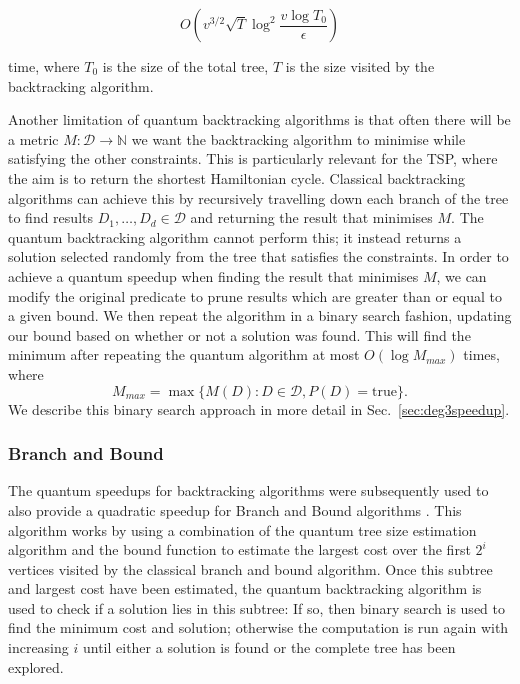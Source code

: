 $$O\left(v^{3/2}\sqrt{T}\log^2\frac{v\log T_0}{\epsilon}\right)$$

\noindent time, where $T_0$ is the size of the total tree, $T$ is the size visited by the backtracking algorithm.

Another limitation of quantum backtracking algorithms is that often there will be a metric $M \colon \mathcal{D} \rightarrow \mathbb{N}$ we want the backtracking algorithm to minimise while satisfying the other constraints. This is particularly relevant for the TSP, where the aim is to return the shortest Hamiltonian cycle. Classical backtracking algorithms can achieve this by recursively travelling down each branch of the tree to find results $D_1,\dots,D_d \in \mathcal{D}$ and returning the result that minimises $M$. The quantum backtracking algorithm cannot perform this; it instead returns a solution selected randomly from the tree that satisfies the constraints. In order to achieve a quantum speedup when finding the result that minimises $M$, we can modify the original predicate to prune results which are greater than or equal to a given bound. We then repeat the algorithm in a binary search fashion, updating our bound based on whether or not a solution was found. This will find the minimum after repeating the quantum algorithm at most $O(\log M_{max})$ times, where
%
\begin{equation}
M_{max} = \max\{M(D):D\in \mathcal{D}, P(D) = \text{true}\}.
\end{equation}
%
We describe this binary search approach in more detail in Sec.\ \ref{sec:deg3speedup}.

\subsubsection{Branch and Bound}

The quantum speedups for backtracking algorithms were subsequently used to also provide a quadratic speedup for Branch and Bound algorithms \cite{montanaro2019}. This algorithm works by using a combination of the quantum tree size estimation algorithm and the bound function to estimate the largest cost over the first $2^i$ vertices visited by the classical branch and bound algorithm. Once this subtree and largest cost have been estimated, the quantum backtracking algorithm is used to check if a solution lies in this subtree: If so, then binary search is used to find the minimum cost and solution; otherwise the computation is run again with increasing $i$ until either a solution is found or the complete tree has been explored.


